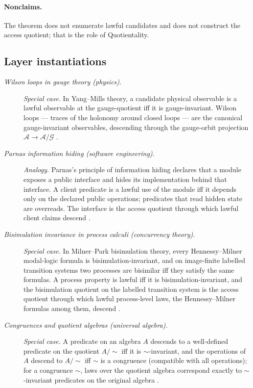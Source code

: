 \paragraph{Nonclaims.} The theorem does not enumerate lawful candidates and does not
construct the access quotient; that is the role of Quotientality.

\subsection*{Layer instantiations}\label{layer-inst:F18}

\begingroup\small
\begin{description}
\item[\emph{Wilson loops in gauge theory (physics).}] \textit{Special case.}
In Yang--Mills theory, a candidate physical observable is a
lawful observable at the gauge-quotient iff it is
gauge-invariant.  Wilson loops --- traces of the holonomy around
closed loops --- are the canonical gauge-invariant
observables, descending through the gauge-orbit projection
\(\mathcal A\to\mathcal A/\mathcal G\)
\citep{Wilson1974ConfinementQuarks}.

\item[\emph{Parnas information hiding (software engineering).}] \textit{Analogy.}
Parnas's principle of information hiding declares that a module
exposes a public interface and hides its implementation behind
that interface.  A client predicate is a lawful use of the
module iff it depends only on the declared public operations;
predicates that read hidden state are overreads.  The interface
is the  access quotient through which lawful client claims
descend
\citep{Parnas1972InformationHiding}.

\item[\emph{Bisimulation invariance in process calculi
(concurrency theory).}] \textit{Special case.}
In Milner--Park bisimulation theory, every Hennessy--Milner
modal-logic formula is bisimulation-invariant, and on image-finite
labelled transition systems two processes are bisimilar iff they
satisfy the same formulas.  A process property is lawful iff it is
bisimulation-invariant, and the bisimulation quotient on the labelled
transition system is the  access quotient through which
lawful process-level laws, the Hennessy--Milner formulas among them,
descend
\citep{Milner1989CommunicationConcurrency}.

\item[\emph{Congruences and quotient algebras (universal
algebra).}] \textit{Special case.}
A predicate on an algebra \(A\) descends to a well-defined predicate
on the quotient \(A/{\sim}\) iff it is \(\sim\)-invariant, and the
operations of \(A\) descend to \(A/{\sim}\) iff \(\sim\) is a
congruence (compatible with all operations); for a congruence
\(\sim\), laws over the quotient algebra correspond exactly to
\(\sim\)-invariant predicates on the original algebra
\citep{Gratzer1979UniversalAlgebra}.

\end{description}
\endgroup


